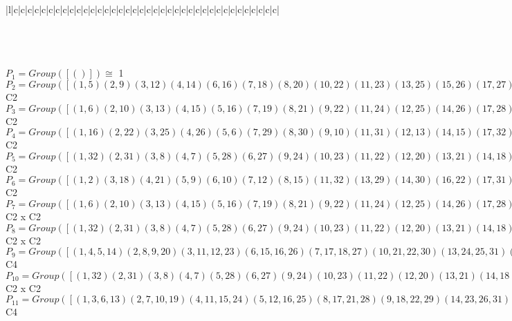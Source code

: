 \documentclass[varwidth=\maxdimen,border=10]{standalone}
\begin{document}
\begin{tabular}
\begin{array}{|l|c|c|c|c|c|c|c|c|c|c|c|c|c|c|c|c|c|c|c|c|c|c|c|c|c|c|c|c|c|c|c|c|c|c|c|c|c|c|}
\end{array}\)\\
\ \\
\ \\
$P_{1} = Group( [ () ] )\cong$ 1\ \\
$P_{2} = Group( [ ( 1, 5)( 2, 9)( 3,12)( 4,14)( 6,16)( 7,18)( 8,20)(10,22)(11,23)(13,25)(15,26)(17,27)(19,29)(21,30)(24,31)(28,32) ] )\cong$ C2\ \\
$P_{3} = Group( [ ( 1, 6)( 2,10)( 3,13)( 4,15)( 5,16)( 7,19)( 8,21)( 9,22)(11,24)(12,25)(14,26)(17,28)(18,29)(20,30)(23,31)(27,32) ] )\cong$ C2\ \\
$P_{4} = Group( [ ( 1,16)( 2,22)( 3,25)( 4,26)( 5, 6)( 7,29)( 8,30)( 9,10)(11,31)(12,13)(14,15)(17,32)(18,19)(20,21)(23,24)(27,28) ] )\cong$ C2\ \\
$P_{5} = Group( [ ( 1,32)( 2,31)( 3, 8)( 4, 7)( 5,28)( 6,27)( 9,24)(10,23)(11,22)(12,20)(13,21)(14,18)(15,19)(16,17)(25,30)(26,29) ] )\cong$ C2\ \\
$P_{6} = Group( [ ( 1, 2)( 3,18)( 4,21)( 5, 9)( 6,10)( 7,12)( 8,15)(11,32)(13,29)(14,30)(16,22)(17,31)(19,25)(20,26)(23,28)(24,27) ] )\cong$ C2\ \\
$P_{7} = Group( [ ( 1, 6)( 2,10)( 3,13)( 4,15)( 5,16)( 7,19)( 8,21)( 9,22)(11,24)(12,25)(14,26)(17,28)(18,29)(20,30)(23,31)(27,32), ( 1, 5)( 2, 9)( 3,12)( 4,14)( 6,16)( 7,18)( 8,20)(10,22)(11,23)(13,25)(15,26)(17,27)(19,29)(21,30)(24,31)(28,32) ] )\cong$ C2 x C2\ \\
$P_{8} = Group( [ ( 1,32)( 2,31)( 3, 8)( 4, 7)( 5,28)( 6,27)( 9,24)(10,23)(11,22)(12,20)(13,21)(14,18)(15,19)(16,17)(25,30)(26,29), ( 1,16)( 2,22)( 3,25)( 4,26)( 5, 6)( 7,29)( 8,30)( 9,10)(11,31)(12,13)(14,15)(17,32)(18,19)(20,21)(23,24)(27,28) ] )\cong$ C2 x C2\ \\
$P_{9} = Group( [ ( 1, 4, 5,14)( 2, 8, 9,20)( 3,11,12,23)( 6,15,16,26)( 7,17,18,27)(10,21,22,30)(13,24,25,31)(19,28,29,32), ( 1, 5)( 2, 9)( 3,12)( 4,14)( 6,16)( 7,18)( 8,20)(10,22)(11,23)(13,25)(15,26)(17,27)(19,29)(21,30)(24,31)(28,32) ] )\cong$ C4\ \\
$P_{10} = Group( [ ( 1,32)( 2,31)( 3, 8)( 4, 7)( 5,28)( 6,27)( 9,24)(10,23)(11,22)(12,20)(13,21)(14,18)(15,19)(16,17)(25,30)(26,29), ( 1, 6)( 2,10)( 3,13)( 4,15)( 5,16)( 7,19)( 8,21)( 9,22)(11,24)(12,25)(14,26)(17,28)(18,29)(20,30)(23,31)(27,32) ] )\cong$ C2 x C2\ \\
$P_{11} = Group( [ ( 1, 3, 6,13)( 2, 7,10,19)( 4,11,15,24)( 5,12,16,25)( 8,17,21,28)( 9,18,22,29)(14,23,26,31)(20,27,30,32), ( 1, 6)( 2,10)( 3,13)( 4,15)( 5,16)( 7,19)( 8,21)( 9,22)(11,24)(12,25)(14,26)(17,28)(18,29)(20,30)(23,31)(27,32) ] )\cong$ C4\ \\

\end{tabular}
\end{document}
